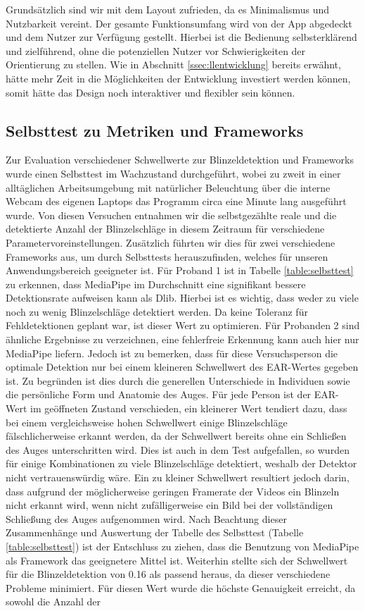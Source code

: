 Grundsätzlich sind wir mit dem Layout zufrieden, da es Minimalismus und Nutzbarkeit vereint. Der gesamte Funktionsumfang wird von der App abgedeckt und dem Nutzer zur Verfügung gestellt. Hierbei ist die Bedienung selbsterklärend und zielführend, ohne die potenziellen Nutzer vor Schwierigkeiten der Orientierung zu stellen. Wie in Abschnitt \ref{ssec:llentwicklung} bereits erwähnt, hätte mehr Zeit in die Möglichkeiten der Entwicklung investiert werden können, somit hätte das Design noch interaktiver und flexibler sein können.

\subsection{Selbsttest zu Metriken und Frameworks}
\label{subsec:selftest}
Zur Evaluation verschiedener Schwellwerte zur Blinzeldetektion und Frameworks wurde einen Selbsttest im Wachzustand durchgeführt, wobei zu zweit in einer alltäglichen Arbeitsumgebung mit natürlicher Beleuchtung über die interne Webcam des eigenen Laptops das Programm circa eine Minute lang ausgeführt wurde. Von diesen Versuchen entnahmen wir die selbstgezählte reale und die detektierte Anzahl der Blinzelschläge in diesem Zeitraum für verschiedene Parametervoreinstellungen. Zusätzlich führten wir dies für zwei verschiedene Frameworks aus, um durch Selbsttests herauszufinden, welches für unseren Anwendungsbereich geeigneter ist. Für Proband 1 ist in Tabelle \ref{table:selbsttest} zu erkennen, dass MediaPipe im Durchschnitt eine signifikant bessere Detektionsrate aufweisen kann als Dlib. Hierbei ist es wichtig, dass weder zu viele noch zu wenig Blinzelschläge detektiert werden. Da keine Toleranz für Fehldetektionen geplant war, ist dieser Wert zu optimieren. Für Probanden 2 sind ähnliche Ergebnisse zu verzeichnen, eine fehlerfreie Erkennung kann auch hier nur MediaPipe liefern. Jedoch ist zu bemerken, dass für diese Versuchsperson die optimale Detektion nur bei einem kleineren Schwellwert des EAR-Wertes gegeben ist. Zu begründen ist dies durch die generellen Unterschiede in Individuen sowie die persönliche Form und Anatomie des Auges. Für jede Person ist der EAR-Wert im geöffneten Zustand verschieden, ein kleinerer Wert tendiert dazu, dass bei einem vergleichsweise hohen Schwellwert einige Blinzelschläge fälschlicherweise erkannt werden, da der Schwellwert bereits ohne ein Schließen des Auges unterschritten wird. Dies ist auch in dem Test aufgefallen, so wurden für einige Kombinationen zu viele Blinzelschläge detektiert, weshalb der Detektor nicht vertrauenswürdig wäre. Ein zu kleiner Schwellwert resultiert jedoch darin, dass aufgrund der möglicherweise geringen Framerate der Videos ein Blinzeln nicht erkannt wird, wenn nicht zufälligerweise ein Bild bei der vollständigen Schließung des Auges aufgenommen wird. Nach Beachtung dieser Zusammenhänge und Auswertung der Tabelle des Selbsttest (Tabelle \ref{table:selbsttest}) ist der Entschluss zu ziehen, dass die Benutzung von MediaPipe als Framework das geeignetere Mittel ist. Weiterhin stellte sich der Schwellwert für die Blinzeldetektion von 0.16 als passend heraus, da dieser verschiedene Probleme minimiert. Für diesen Wert wurde die höchste Genauigkeit erreicht, da sowohl die Anzahl der 